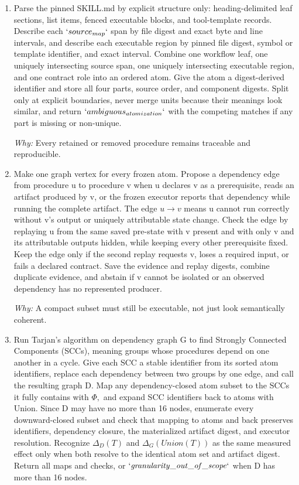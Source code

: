 \documentclass[10pt,a4paper]{article}
\begin{document}
\begin{enumerate}[leftmargin=*,start=4]
  \item Parse the pinned SKILL.md by explicit structure only: heading-delimited leaf sections, list items, fenced executable blocks, and tool-template records. Describe each \(`source_{map}`\) span by file digest and exact byte and line intervals, and describe each executable region by pinned file digest, symbol or template identifier, and exact interval. Combine one workflow leaf, one uniquely intersecting source span, one uniquely intersecting executable region, and one contract role into an ordered atom. Give the atom a digest-derived identifier and store all four parts, source order, and component digests. Split only at explicit boundaries, never merge units because their meanings look similar, and return \(`ambiguous_{atomization}`\) with the competing matches if any part is missing or non-unique.
\par\emph{Why:} Every retained or removed procedure remains traceable and reproducible.
  \item Make one graph vertex for every frozen atom. Propose a dependency edge from procedure u to procedure v when u declares v as a prerequisite, reads an artifact produced by v, or the frozen executor reports that dependency while running the complete artifact. The edge \(u\to v\) means u cannot run correctly without v's output or uniquely attributable state change. Check the edge by replaying u from the same saved pre-state with v present and with only v and its attributable outputs hidden, while keeping every other prerequisite fixed. Keep the edge only if the second replay requests v, loses a required input, or fails a declared contract. Save the evidence and replay digests, combine duplicate evidence, and abstain if v cannot be isolated or an observed dependency has no represented producer.
\par\emph{Why:} A compact subset must still be executable, not just look semantically coherent.
  \item Run Tarjan's algorithm on dependency graph G to find Strongly Connected Components (SCCs), meaning groups whose procedures depend on one another in a cycle. Give each SCC a stable identifier from its sorted atom identifiers, replace each dependency between two groups by one edge, and call the resulting graph D. Map any dependency-closed atom subset to the SCCs it fully contains with \(\Phi ,\) and expand SCC identifiers back to atoms with Union. Since D may have no more than 16 nodes, enumerate every downward-closed subset and check that mapping to atoms and back preserves identifiers, dependency closure, the materialized artifact digest, and executor resolution. Recognize \(\Delta _{D}(T)\) and \(\Delta _{G}(Union(T))\) as the same measured effect only when both resolve to the identical atom set and artifact digest. Return all maps and checks, or \(`\mathit{granularity\_out\_of\_scope}`\) when D has more than 16 nodes.

\end{enumerate}
\end{document}
